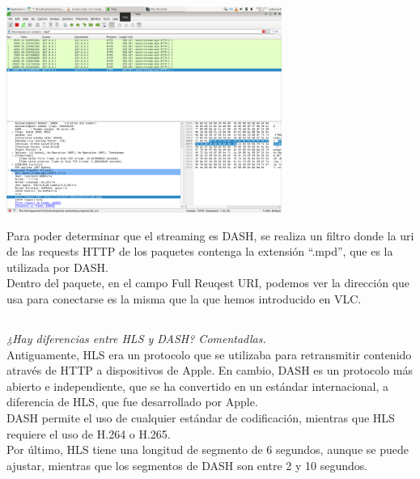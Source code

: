 \documentclass[spanish]{article}
\begin{document}
\begin{center}
\includegraphics[width=9cm]{../img/17.png}
\end{center}

Para poder determinar que el streaming es DASH, se realiza
un filtro donde la uri de las requests HTTP de los paquetes
contenga la extensión ``.mpd'', que es la utilizada por
DASH.\\

Dentro del paquete, en el campo Full Reuqest URI, podemos
ver la dirección que usa para conectarse es la misma que la
que hemos introducido en VLC.

\subsection{}

\textit{¿Hay diferencias entre HLS y DASH? Comentadlas.}\\

Antiguamente, HLS era un protocolo que se utilizaba para
retransmitir contenido através de HTTP a dispositivos de
Apple. En cambio, DASH es un protocolo más abierto e
independiente, que se ha convertido en un estándar
internacional, a diferencia de HLS, que fue desarrollado por
Apple.\\

DASH permite el uso de cualquier estándar de codificación,
mientras que HLS requiere el uso de H.264 o H.265.\\

Por último, HLS tiene una longitud de segmento de 6
segundos, aunque se puede ajustar, mientras que los
segmentos de DASH son entre 2 y 10 segundos.\\
\end{document}
